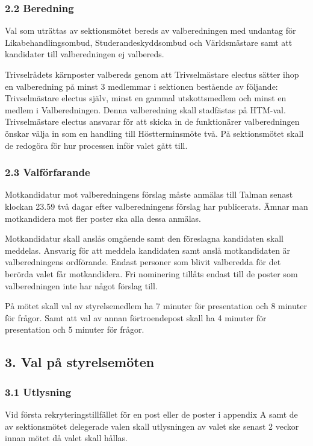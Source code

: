 \documentclass{dsekkallelse}
\begin{document}
\subsubsection{2.2 Beredning}
Val som uträttas av sektionsmötet bereds av valberedningen med undantag för Likabehandlingsombud, Studerandeskyddsombud och Världsmästare samt att kandidater till valberedningen ej valbereds. 

Trivselrådets kärnposter valbereds genom att Trivselmästare electus sätter ihop en valberedning på minst 3 medlemmar i sektionen bestående av följande: Trivselmästare electus själv, minst en gammal utskottsmedlem och minst en medlem i Valberedningen. Denna valberedning skall stadfästas på HTM-val. Trivselmästare electus ansvarar för att skicka in de funktionärer valberedningen önskar välja in som en handling till Höstterminsmöte två. På sektionsmötet skall de redogöra för hur processen inför valet gått till.

\subsubsection{2.3 Valförfarande}
Motkandidatur mot valberedningens förslag måste anmälas till Talman senast klockan 23.59 två dagar efter valberedningens förslag har publicerats. Ämnar man motkandidera mot fler poster ska alla dessa anmälas.

Motkandidatur skall anslås omgående samt den föreslagna kandidaten skall meddelas. Ansvarig för att meddela kandidaten samt anslå motkandidaten är valberedningens ordförande. Endast personer som blivit valberedda för det berörda valet får motkandidera.
Fri nominering tillåts endast till de poster som valberedningen inte har något förslag till.

På mötet skall val av styrelsemedlem ha 7 minuter för presentation och 8 minuter för frågor. Samt att val av annan förtroendepost skall ha 4 minuter för presentation och 5 minuter för frågor.

\subsection{3. Val på styrelsemöten}

\subsubsection{3.1 Utlysning}
Vid första rekryteringstillfället för en post eller de poster i appendix A samt de av sektionsmötet delegerade valen skall utlysningen av valet ske senast 2 veckor innan mötet då valet skall hållas. 
\end{document}
